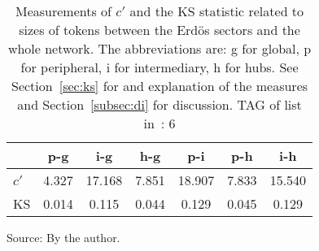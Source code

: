 \begin{table}[h!]
\begin{center}
	\caption{Measurements of $c'$ and the KS statistic related to sizes of tokens between the Erd\"os sectors and the whole network. The abbreviations are: g for global, p for peripheral, i for intermediary, h for hubs. See Section~\ref{sec:ks} for and explanation of the measures and Section~\ref{subsec:di} for discussion. TAG of list in~\cite{textTables}: 6}
\label{tab:kolTok}
\begin{tabular}{| l || c | c | c | c | c | c |}\hline
{\bf } & {\bf p-g} & {\bf i-g} & {\bf h-g} & {\bf p-i} & {\bf p-h} & {\bf i-h} \\\hline\hline
$c'$ & 4.327  & 17.168  & 7.851  & 18.907  & 7.833  & 15.540 \\
KS & 0.014  & 0.115  & 0.044  & 0.129  & 0.045  & 0.129 \\\hline
\end{tabular}
\begin{flushleft}\footnotesize
Source: By the author.\
\end{flushleft}
\end{center}
\end{table}
